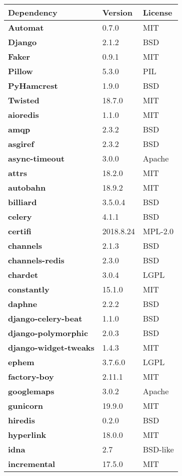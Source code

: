 \begin{longtable}{| p{} | p{} | p{} |}
\hline
\textbf{Dependency} & \textbf{Version} & \textbf{License} \\ \hline
\textbf{Automat} & 0.7.0 & MIT \\
\textbf{Django} & 2.1.2 & BSD \\
\textbf{Faker} & 0.9.1 & MIT \\
\textbf{Pillow} & 5.3.0 & PIL \\
\textbf{PyHamcrest} & 1.9.0 & BSD \\
\textbf{Twisted} & 18.7.0 & MIT \\
\textbf{aioredis} & 1.1.0 & MIT \\
\textbf{amqp} & 2.3.2 & BSD \\
\textbf{asgiref} & 2.3.2 & BSD \\
\textbf{async-timeout} & 3.0.0 & Apache \\
\textbf{attrs} & 18.2.0 & MIT \\
\textbf{autobahn} & 18.9.2 & MIT \\
\textbf{billiard} & 3.5.0.4 & BSD \\
\textbf{celery} & 4.1.1 & BSD \\
\textbf{certifi} & 2018.8.24 & MPL-2.0 \\
\textbf{channels} & 2.1.3 & BSD \\
\textbf{channels-redis} & 2.3.0 & BSD \\
\textbf{chardet} & 3.0.4 & LGPL \\
\textbf{constantly} & 15.1.0 & MIT \\
\textbf{daphne} & 2.2.2 & BSD \\
\textbf{django-celery-beat} & 1.1.0 & BSD \\
\textbf{django-polymorphic} & 2.0.3 & BSD \\
\textbf{django-widget-tweaks} & 1.4.3 & MIT \\
\textbf{ephem} & 3.7.6.0 & LGPL \\
\textbf{factory-boy} & 2.11.1 & MIT \\
\textbf{googlemaps} & 3.0.2 & Apache \\
\textbf{gunicorn} & 19.9.0 & MIT \\
\textbf{hiredis} & 0.2.0 & BSD \\
\textbf{hyperlink} & 18.0.0 & MIT \\
\textbf{idna} & 2.7 & BSD-like \\
\textbf{incremental} & 17.5.0 & MIT \\

\end{longtable}
